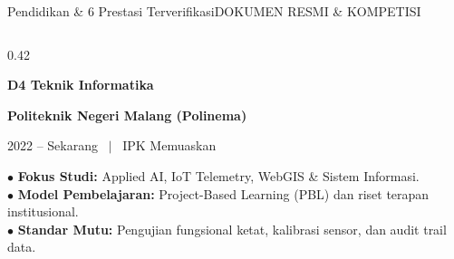 \documentclass[aspectratio=169,11pt]{beamer}
\begin{document}
\begin{frame}{Pendidikan \& 6 Prestasi Terverifikasi}{DOKUMEN RESMI \& KOMPETISI}
  \begin{columns}[t]
    \begin{column}{0.42\textwidth}
      \begin{tcolorbox}[colback=brandCardBg,colframe=brandBorder,arc=2mm,boxrule=0.6pt,boxsep=3pt,top=4pt,bottom=4pt,title={\footnotesize \bfseries \color{brandNavy} Riwayat Akademik}]
        {\small \bfseries \color{brandNavy} D4 Teknik Informatika} \par
        {\scriptsize \bfseries \color{brandBlue} Politeknik Negeri Malang (Polinema)} \par
        {\tiny \color{brandSlate} 2022 -- Sekarang \ $|$ \ IPK Memuaskan} \par \vspace{3pt}
        {\scriptsize \color{brandDark}
        $\bullet$ \textbf{Fokus Studi:} Applied AI, IoT Telemetry, WebGIS \& Sistem Informasi. \\
        $\bullet$ \textbf{Model Pembelajaran:} Project-Based Learning (PBL) dan riset terapan institusional. \\
        $\bullet$ \textbf{Standar Mutu:} Pengujian fungsional ketat, kalibrasi sensor, dan audit trail data.
        }
      \end{tcolorbox}
    \end{column}


\end{columns}
\end{frame}
\end{document}
